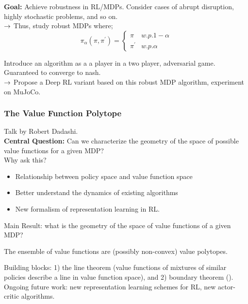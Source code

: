 {\bf Goal:} Achieve robustness in RL/MDPs. Consider cases of abrupt disruption, highly stochastic problems, and so on. \\

$\rightarrow$ Thus, study robust MDPs where;
\[
\pi_\alpha(\pi, \pi^') = \begin{cases}
\pi& w.p. 1-\alpha \\
\pi^'& w.p. \alpha
\end{cases}
\]

Introduce an algorithm as a a player in a two player, adversarial game. Guaranteed to converge to nash. \\

$\rightarrow$ Propose a Deep RL variant based on this robust MDP algorithm, experiment on MuJoCo. 

\spacerule

\subsubsection{The Value Function Polytope~\cite{dadashi2019value}}

Talk by Robert Dadashi. \\

{\bf Central Question:} Can we characterize the geometry of the space of possible value functions for a given MDP? \\

Why ask this?
\begin{itemize}
    \item Relationship between policy space and value function space
    \item Better understand the dynamics of existing algorithms
    \item New formalism of representation learning in RL.
\end{itemize}

Main Result: what is the geometry of the space of value functions of a given MDP?
\begin{theorem}
The ensemble of value functions are (possibly non-convex) value polytopes.
\end{theorem}

Building blocks: 1) the line theorem (value functions of mixtures of similar policies describe a line in value function space), and 2) boundary theorem ().\\

Ongoing future work: new representation learning schemes for RL, new actor-critic algorithms. \\

